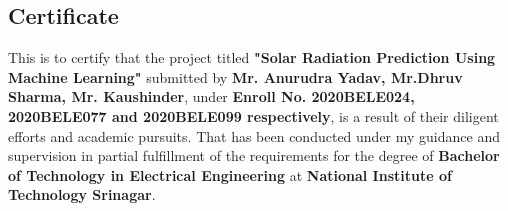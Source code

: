 \documentclass[12pt,a4paper]{report}
\begin{document}
		
		\clearpage
\begin{center}
	\noindent{\rule{\textwidth}{1.0pt}}
	\section*{Certificate}
	\noindent{\rule{\textwidth}{1.0pt}}
\end{center}
This is to certify that the project titled \textbf{"Solar Radiation Prediction Using Machine Learning"} submitted by \textbf{Mr. Anurudra Yadav, Mr.Dhruv Sharma, Mr. Kaushinder}, under \textbf{ Enroll No. 2020BELE024, 2020BELE077 and 2020BELE099 respectively}, is a result of their diligent efforts and academic pursuits. That has been conducted under my guidance and supervision in partial fulfillment of the requirements for the degree of \textbf{Bachelor of Technology in Electrical Engineering} at \textbf{ National Institute of Technology Srinagar}.
\end{document}
